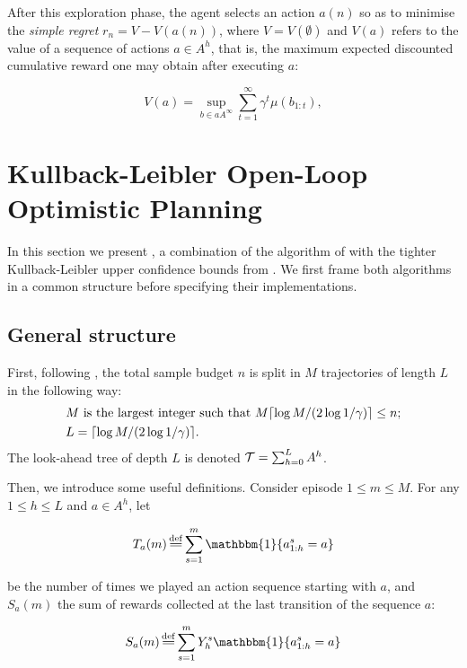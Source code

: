 \documentclass[runningheads]{llncs}
\newcommand{\citep}{\cite}
\begin{document}
After this exploration phase, the agent selects an action $a(n)$ so as to minimise the \emph{simple regret} $r_n = V - V(a(n))$, where $V=V(\emptyset)$ and $V(a)$ refers to the value of a sequence of actions $a\in A^h$, that is, the maximum expected discounted cumulative reward one may obtain after executing $a$:


\begin{equation}
\label{eq:value}
V(a) = \sup_{b\in aA^\infty} \sum_{t=1}^\infty \gamma^t\mu(b_{1:t}),
\end{equation}


\section{Kullback-Leibler Open-Loop Optimistic Planning}
\label{sec:kl-olop}

In this section we present \KLOLOP, a combination of the \OLOP algorithm of \citep{Bubeck2010} with the tighter Kullback-Leibler upper confidence bounds from \citep{Cappe2013}. We first frame both algorithms in a common structure before specifying their implementations.

\subsection{General structure}

First, following \OLOP, the total sample budget $n$ is split in $M$ trajectories of length $L$ in the following way: 
\begin{align*}
    &M\text{ is the largest integer such that } M \lceil\log M/(2 \log 1/\gamma)\rceil \leq n;\\
    &L= \lceil\log M / (2 \log 1/\gamma)\rceil.
\end{align*}
The look-ahead tree of depth $L$ is denoted $\mathcal{T} = \sum_{h=0}^L A^h$.

Then, we introduce some useful definitions. Consider episode $1 \leq m \leq M$. For any $1 \leq h \leq L$ and $a\in A^h$, let 


\begin{equation*}
    T_a(m) \eqdef \sum_{s=1}^m \mathbbm{1}\{a^s_{1:h} = a\}
\end{equation*}


\noindent
be the number of times we played an action sequence starting with $a$, and $S_a(m)$ the sum of rewards collected at the last transition of the sequence $a$:


\begin{equation*}
    S_a(m) \eqdef \sum_{s=1}^m Y^s_h \mathbbm{1}\{a^s_{1:h} = a\}
\end{equation*}
\end{document}
